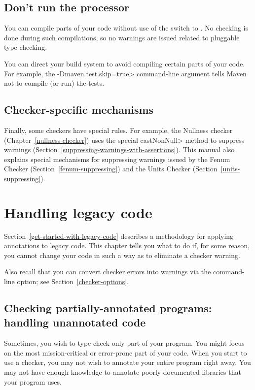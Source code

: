 \section{Don't run the processor\label{no-processor}}

You can compile parts of your code without use of the
 switch to .  No checking is done during
such compilations, so no warnings are issued related to pluggable
type-checking.

You can direct your build system to avoid compiling certain parts of your
code.  For example, the \<-Dmaven.test.skip=true> command-line argument
tells Maven not to compile (or run) the tests.


\section{Checker-specific mechanisms\label{checker-specific-suppression}}

Finally, some checkers have special rules.  For example, the Nullness
checker (Chapter~\ref{nullness-checker}) uses
the special \<castNonNull> method to suppress warnings
(Section~\ref{suppressing-warnings-with-assertions}).
This manual also explains special mechanisms for
suppressing warnings issued by the Fenum Checker
(Section~\ref{fenum-suppressing}) and the Units Checker
(Section~\ref{units-suppressing}).



\htmlhr
\chapter{Handling legacy code\label{legacy-code}}

Section~\ref{get-started-with-legacy-code} describes a methodology for
applying annotations to legacy code.  This chapter tells you what to do if,
for some reason, you cannot change your code in such a way as to eliminate
a checker warning.

Also recall that you can convert checker errors into warnings via the
 command-line option; see Section~\ref{checker-options}.


\section{Checking partially-annotated programs:  handling unannotated code\label{unannotated-code}}

Sometimes, you wish to type-check only part of your program.
You might focus on the most mission-critical or error-prone part of your
code.  When you start to use a checker, you may not wish to annotate
your entire program right away.
You may not have
enough knowledge to annotate poorly-documented libraries that your program uses.

